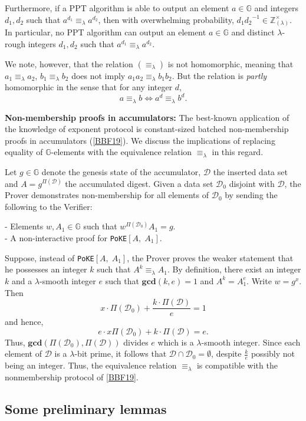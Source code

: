 \documentclass[11pt, lettersize, notitlepage, leqno, footskip=0.6cm]{article}
\newcommand{\bz}{\mathbb Z}
\newcommand{\LRA}{\Longleftrightarrow}
\newcommand{\eqlam}{\equiv_{\lam}}
\newcommand{\mc}{\mathcal}
\newcommand{\mb}{\mathbb}
\newcommand{\mbf}{\mathbf}
\newcommand{\lam}{\lambda}
\newcommand{\bzlam}{\bz_{(\lam)}}
\newcommand{\vs}{\vspace{-0.15cm}}
\newcommand{\noin}{\noindent}
\newcommand{\op}{overwhelming probability}
\newcommand{\GCD}{\mbf{gcd}}
\numberwithin{equation}{section}
\begin{document}
Furthermore, if a PPT algorithm is able to output an element $a\in\mb{G}$ and integers $d_1,d_2$ such that $a^{d_1}\eqlam a^{d_2}$, then with \op, ${d_1}{d_2}^{-1}\in\bzlam^{\times}$. In particular, no PPT algorithm can output an element $a\in \mb{G}$ and distinct $\lam$-rough integers $d_1,d_2$ such that $a^{d_1}\eqlam a^{d_2}$.

We note, however, that the relation $(\equiv_{\lam})$ is not homomorphic, meaning that $a_1 \equiv_{\lam} a_2$, $b_1 \equiv_{\lam} b_2$ does not imply $a_1a_2 \eqlam b_1b_2$. But the relation is \textit{partly} homomorphic in the sense that for any integer $d$, \vs $$ a \equiv_{\lam} b \LRA a^d \equiv_{\lam} b^d .$$ 


\noin \textbf{Non-membership proofs in accumulators:} The  best-known application of the knowledge of exponent protocol is constant-sized batched non-membership proofs in accumulators (\hyperlink{BBF19}{[BBF19]}). We discuss the implications of replacing equality of $\mb{G}$-elements with the equivalence relation $\eqlam$ in this regard. 

Let $g \in \mb{G}$ denote the genesis state of the accumulator, $\mc{D}$ the inserted data set and $A = g^{\Pi(\mc{D})}$ the accumulated digest. Given a data set $\mc{D}_0$ disjoint with $\mc{D}$, the Prover demonstrates non-membership for all elements of $\mc{D}_0$ by sending the following to the Verifier:

\noin - Elements $w, A_1\in\mb{G}$ such that $w^{\Pi(\mc{D}_0)}A_1 = g$.\\
- A non-interactive proof for \verb|PoKE|$[A,\; A_1]$.

Suppose, instead of \verb|PoKE|$[A,\; A_1]$, the Prover proves the weaker statement that he possesses an integer $k$ such that $A^k \eqlam A_1$. By definition, there exist an integer $k$ and a $\lam$-smooth integer $e$ such that $\GCD(k,e) = 1$ and $A^{k} = A_1^e$. Write $w = g^x$. Then \vs $$ x\cdot  \Pi(\mc{D}_0) +  \frac{k\cdot\Pi(\mc{D})}{e} = 1 $$ and hence, \vs $$e\cdot x \Pi(\mc{D}_0) +  k\cdot\Pi(\mc{D}) = e .$$ Thus, $\GCD(\Pi(\mc{D}_0), \Pi(\mc{D}))$ divides $e$ which is a $\lam$-smooth integer. Since each element of $\mc{D}$ is a $\lam$-bit prime, it follows that $\mc{D}\cap \mc{D}_0 = \emptyset$, despite $\frac{k}{e}$ possibly not being an integer. Thus, the equivalence relation $\eqlam$ is compatible with the nonmembership protocol of \hyperlink{BBF19}{[BBF19]}.

\subsection{\fontsize{11}{11}\selectfont Some preliminary lemmas }
\end{document}
